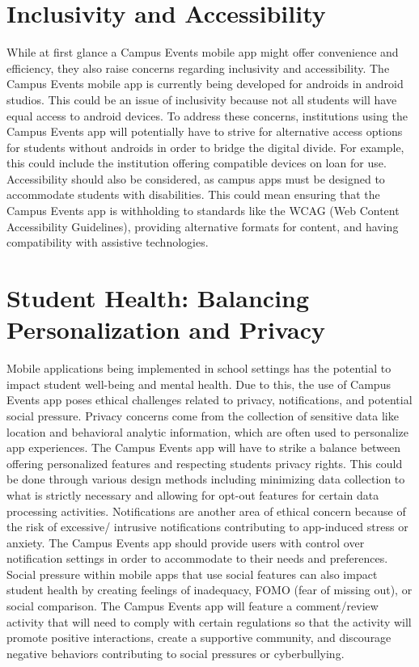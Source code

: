 \documentclass[10pt,twocolumn]{article}
\begin{document}
\section{Inclusivity and Accessibility}
While at first glance a Campus Events mobile app might offer convenience and efficiency, they also raise concerns regarding inclusivity and accessibility. The Campus Events mobile app is currently being developed for androids in android studios. This could be an issue of inclusivity because not all students will have equal access to android devices. 
To address these concerns, institutions using the Campus Events app will potentially have to strive for alternative access options for students without androids in order to bridge the digital divide. For example, this could include the institution offering compatible devices on loan for use.
Accessibility should also be considered, as campus apps must be designed to accommodate students with disabilities. This could mean ensuring that the Campus Events app is withholding to standards like the WCAG (Web Content Accessibility Guidelines)\cite{WCAG}, providing alternative formats for content, and having compatibility with assistive technologies.

\section{Student Health: Balancing Personalization and Privacy}
Mobile applications being implemented in school settings has the potential to impact student well-being and mental health\cite{UofW_IT}. Due to this, the use of Campus Events app poses ethical challenges related to privacy, notifications, and potential social pressure.
Privacy concerns come from the collection of sensitive data like location and behavioral analytic information, which are often used to personalize app experiences. The Campus Events app will have to strike a balance between offering personalized features and respecting students privacy rights. This could be done through various design methods including minimizing data collection to what is strictly necessary and allowing for opt-out features for certain data processing activities.\cite{ANA_MobileMarketing}
Notifications are another area of ethical concern because of the risk of excessive/ intrusive notifications contributing to app-induced stress or anxiety.\cite{Appedus} The Campus Events app should provide users with control over notification settings in order to accommodate to their needs and preferences.
Social pressure within mobile apps that use social features can also impact student health by creating feelings of inadequacy, FOMO (fear of missing out), or social comparison. The Campus Events app will feature a comment/review activity that will need to comply with certain regulations so that the activity will promote positive interactions, create a supportive community, and discourage negative behaviors contributing to social pressures or cyberbullying.
\end{document}
